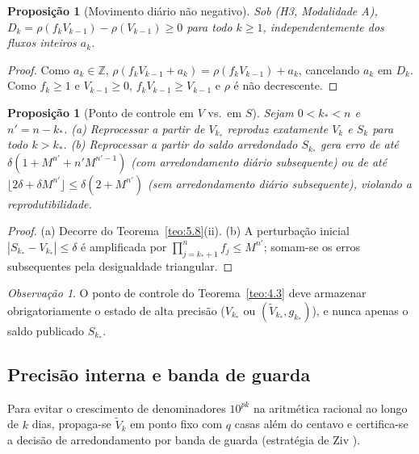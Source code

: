 \documentclass[11pt, a4paper]{article}
\theoremstyle{definition}
\theoremstyle{plain}
\newtheorem{proposicao}[definicao]{Proposição}
\theoremstyle{remark}
\newtheorem{observacao}[definicao]{Observação}
\begin{document}
\begin{proposicao}[Movimento diário não negativo]\label{prop:5.9}
Sob (H3, Modalidade A), $D_k = \rho(f_k V_{k-1}) - \rho(V_{k-1}) \ge 0$ para todo $k \ge 1$, independentemente dos fluxos inteiros $a_k$.
\end{proposicao}
\begin{proof}
Como $a_k \in \mathbb{Z}$, $\rho(f_k V_{k-1} + a_k) = \rho(f_k V_{k-1}) + a_k$, cancelando $a_k$ em $D_k$. Como $f_k \ge 1$ e $V_{k-1} \ge 0$, $f_k V_{k-1} \ge V_{k-1}$ e $\rho$ é não decrescente.
\end{proof}

\begin{proposicao}[Ponto de controle em $V$ vs.\ em $S$]\label{prop:5.10}
Sejam $0 < k_* < n$ e $n' = n - k_*$. (a) Reprocessar a partir de $V_{k_*}$ reproduz exatamente $V_k$ e $S_k$ para todo $k > k_*$. (b) Reprocessar a partir do saldo arredondado $S_{k_*}$ gera erro de até $\delta(1 + M^{n'} + n' M^{n'-1})$ (com arredondamento diário subsequente) ou de até $\lfloor 2\delta + \delta M^{n'} \rfloor \le \delta(2 + M^{n'})$ (sem arredondamento diário subsequente), violando a reprodutibilidade.
\end{proposicao}
\begin{proof}
(a) Decorre do Teorema~\ref{teo:5.8}(ii). (b) A perturbação inicial $|S_{k_*} - V_{k_*}| \le \delta$ é amplificada por $\prod_{j=k_*+1}^n f_j \le M^{n'}$; somam-se os erros subsequentes pela desigualdade triangular.
\end{proof}

\begin{observacao}\label{obs:5.11}
O ponto de controle do Teorema~\ref{teo:4.3} deve armazenar obrigatoriamente o estado de alta precisão ($V_{k_*}$ ou $(\tilde{V}_{k_*}, g_{k_*})$), e nunca apenas o saldo publicado $S_{k_*}$.
\end{observacao}

\subsection{Precisão interna e banda de guarda}\label{sec:5.4}

Para evitar o crescimento de denominadores $10^{pk}$ na aritmética racional ao longo de $k$ dias, propaga-se $\tilde{V}_k$ em ponto fixo com $q$ casas além do centavo e certifica-se a decisão de arredondamento por banda de guarda (estratégia de Ziv \cite{Ziv1991, Muller2018}).
\end{document}
